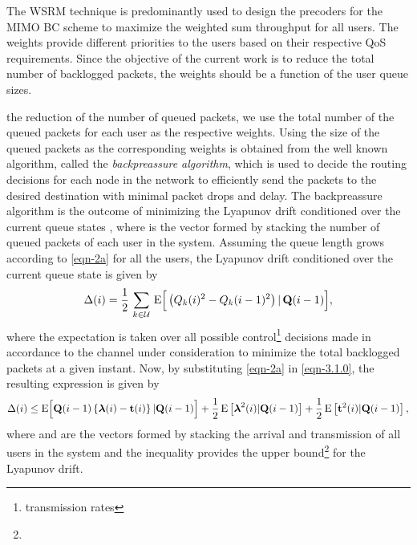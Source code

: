 
The \ac{WSRM} technique is predominantly used to design the precoders for the \ac{MIMO} \ac{BC} scheme to maximize the weighted sum throughput for all users. The weights provide different priorities to the users based on their respective \ac{QoS} requirements. Since the objective of the current work is to reduce the total number of backlogged packets, the weights should be a function of the user queue sizes.

the reduction of the number of queued packets, we use the total number of the queued packets for each user as the respective weights. Using the size of the queued packets as the corresponding weights is obtained from the well known algorithm, called the \textit{backpreassure algorithm}, which is used to decide the routing decisions for each node in the network to efficiently send the packets to the desired destination with minimal packet drops and delay. The backpreassure algorithm is the outcome of minimizing the Lyapunov drift \cite{neely2010stochastic} conditioned over the current queue states , where  is the vector formed by stacking the number of queued packets of each user in the system. Assuming the queue length grows according to \eqref{eqn-2a} for all the users, the Lyapunov drift conditioned over the current queue state is given by
\begin{equation} \label{eqn-3.1.0}
\Delta(i) = \frac{1}{2} \, \sum_{k \in \mc{U}} \, \mathrm{E} \Big{[}  \left ( Q_k(i)^2 - Q_k(i-1)^2 \right ) \vert \, \mbf{Q}(i - 1) \Big{]},
\end{equation}
where the expectation is taken over all possible control\footnote{transmission rates} decisions made in accordance to the channel under consideration to minimize the total backlogged packets at a given instant. Now, by substituting \eqref{eqn-2a} in \eqref{eqn-3.1.0}, the resulting expression is given by
\begin{equation}
\Delta(i) \leq \mathrm{E} \Big{[} \mbf{Q}(i-1) \left \lbrace \mbfa{\lambda}(i) - \mbf{t}(i) \right \rbrace | \mbf{Q}(i-1) \Big{]} + \frac{1}{2} \,\mathrm{E} \left [ \mbfa{\lambda}^2(i) | \mbf{Q}(i-1) \right ] + \frac{1}{2} \,\mathrm{E} \left [ \mbf{t}^2(i) | \mbf{Q}(i-1) \right ],
\label{drift-exp}
\end{equation}
where \me{\mbfa{\lambda}} and  are the vectors formed by stacking the arrival and transmission of all users in the system and the inequality provides the upper bound\footnote{} for the Lyapunov drift.

